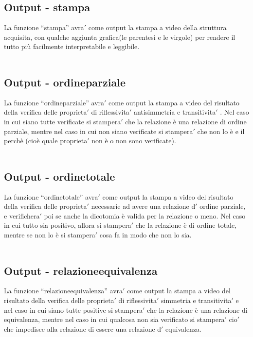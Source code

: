 \documentclass[11pt, a4paper, titlepage, block]{article}
\begin{document}
	\subsection{Output - stampa}
	La funzione “stampa” avra$'$  come output la stampa a video della struttura acquisita, con qualche aggiunta grafica(le parentesi e le virgole) per rendere il tutto più facilmente interpretabile e leggibile.\\
	\\
	\subsection{Output - ordine\textunderscore parziale}
	La funzione “ordine\textunderscore parziale” avra$'$  come output la stampa a video del risultato della verifica delle proprieta$'$  di riflessivita$'$  antisimmetria e transitivita$'$ . Nel caso in cui siano tutte verificate si stampera$'$  che la relazione \`e  una relazione di ordine parziale, mentre nel caso in cui non siano verificate si stampera$'$  che non lo \`e  e il perch\`e  (cio\`e  quale proprieta$'$  non \`e  o non sono verificate).\\
	\\
	\subsection{Output - ordine\textunderscore totale}
	La funzione “ordine\textunderscore totale” avra$'$  come output la stampa a video del risultato della verifica delle proprieta$'$  necessarie ad avere una relazione d$'$ ordine parziale, e verifichera$'$  poi se anche la dicotomia \`e valida per la relazione o meno. Nel caso in cui tutto sia positivo, allora si stampera$'$  che la relazione \`e  di ordine totale, mentre se non lo \`e  si stampera$'$  cosa fa in modo che non lo sia.\\
	\\
	\subsection{Output - relazione\textunderscore equivalenza}
	La funzione “relazione\textunderscore equivalenza” avra$'$  come output la stampa a video del risultato della verifica delle proprieta$'$  di riflessivita$'$  simmetria e transitivita$'$  e nel caso in cui siano tutte positive si stampera$'$  che la relazione \`e  una relazione di equivalenza, mentre nel caso in cui qualcosa non sia verificato si stampera$'$  cio$'$  che impedisce alla relazione di essere una relazione d$'$ equivalenza.\\
	\\
\end{document}
